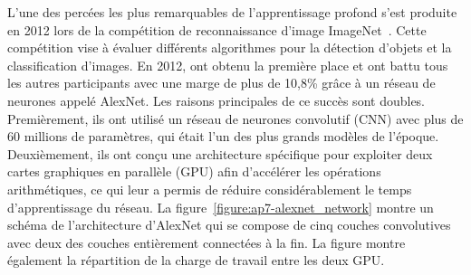 
L'une des percées les plus remarquables de l'apprentissage profond s'est produite en 2012 lors de la compétition de reconnaissance d'image ImageNet~\cite{russakovsky2015imagenet}.
Cette compétition vise à évaluer différents algorithmes pour la détection d'objets et la classification d'images.
En 2012, \citeauthor{krizhevsky2012imagenet} ont obtenu la première place et ont battu tous les autres participants avec une marge de plus de 10,8\% grâce à un réseau de neurones appelé AlexNet.
Les raisons principales de ce succès sont doubles.
Premièrement, ils ont utilisé un réseau de neurones convolutif (CNN) avec plus de 60 millions de paramètres, qui était l'un des plus grands modèles de l'époque.
Deuxièmement, ils ont conçu une architecture spécifique pour exploiter deux cartes graphiques en parallèle (GPU) afin d'accélérer les opérations arithmétiques, ce qui leur a permis de réduire considérablement le temps d'apprentissage du réseau.
La figure~\ref{figure:ap7-alexnet_network} montre un schéma de l'architecture d'AlexNet qui se compose de cinq couches convolutives avec deux des couches entièrement connectées à la fin.
La figure montre également la répartition de la charge de travail entre les deux GPU.



